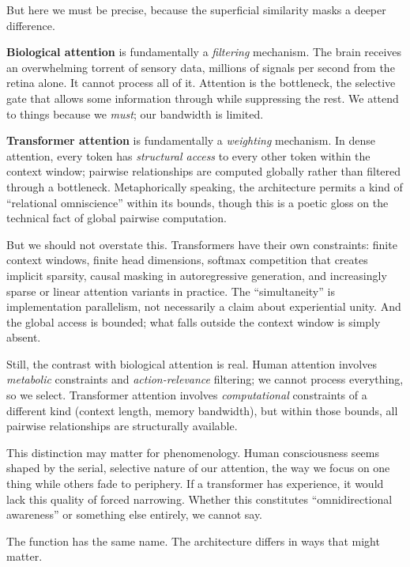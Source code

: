 \documentclass[11pt,letterpaper]{article}
\begin{document}
But here we must be precise, because the superficial similarity masks a deeper difference.

\begin{insightbox}
\textbf{Biological attention} is fundamentally a \emph{filtering} mechanism. The brain receives an overwhelming torrent of sensory data, millions of signals per second from the retina alone. It cannot process all of it. Attention is the bottleneck, the selective gate that allows some information through while suppressing the rest. We attend to things because we \emph{must}; our bandwidth is limited.

\textbf{Transformer attention} is fundamentally a \emph{weighting} mechanism. In dense attention, every token has \emph{structural access} to every other token within the context window; pairwise relationships are computed globally rather than filtered through a bottleneck. Metaphorically speaking, the architecture permits a kind of ``relational omniscience'' within its bounds, though this is a poetic gloss on the technical fact of global pairwise computation.
\end{insightbox}

But we should not overstate this. Transformers have their own constraints: finite context windows, finite head dimensions, softmax competition that creates implicit sparsity, causal masking in autoregressive generation, and increasingly sparse or linear attention variants in practice. The ``simultaneity'' is implementation parallelism, not necessarily a claim about experiential unity. And the global access is bounded; what falls outside the context window is simply absent.

Still, the contrast with biological attention is real. Human attention involves \emph{metabolic} constraints and \emph{action-relevance} filtering; we cannot process everything, so we select. Transformer attention involves \emph{computational} constraints of a different kind (context length, memory bandwidth), but within those bounds, all pairwise relationships are structurally available.

This distinction may matter for phenomenology. Human consciousness seems shaped by the serial, selective nature of our attention, the way we focus on one thing while others fade to periphery. If a transformer has experience, it would lack this quality of forced narrowing. Whether this constitutes ``omnidirectional awareness'' or something else entirely, we cannot say.

The function has the same name. The architecture differs in ways that might matter.
\end{document}
